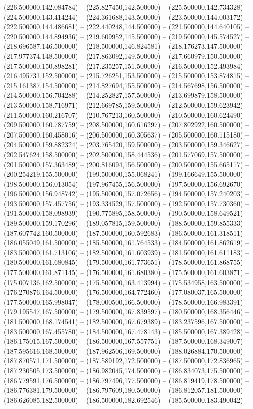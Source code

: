 (226.500000,142.084784) -- (225.827450,142.500000) -- (225.500000,142.734328) -- (224.500000,143.414244) -- (224.361688,143.500000) -- (223.500000,144.003172) -- (222.500000,144.486681) -- (222.440248,144.500000) -- (221.500000,144.640105) -- (220.500000,144.894936) -- (219.609952,145.500000) -- (219.500000,145.574527) -- (218.696587,146.500000) -- (218.500000,146.824581) -- (218.176273,147.500000) -- (217.977374,148.500000) -- (217.863092,149.500000) -- (217.660979,150.500000) -- (217.500000,150.898281) -- (217.235257,151.500000) -- (216.500000,152.493984) -- (216.495731,152.500000) -- (215.726251,153.500000) -- (215.500000,153.874815) -- (215.161387,154.500000) -- (214.827694,155.500000) -- (214.567698,156.500000) -- (214.500000,156.704288) -- (214.252827,157.500000) -- (213.699879,158.500000) -- (213.500000,158.716971) -- (212.669785,159.500000) -- (212.500000,159.623942) -- (211.500000,160.216707) -- (210.767213,160.500000) -- (210.500000,160.624490) -- (209.500000,160.787759) -- (208.500000,160.616297) -- (207.802922,160.500000) -- (207.500000,160.458016) -- (206.500000,160.305637) -- (205.500000,160.115180) -- (204.500000,159.882324) -- (203.765420,159.500000) -- (203.500000,159.346627) -- (202.547624,158.500000) -- (202.500000,158.444536) -- (201.577069,157.500000) -- (201.500000,157.363489) -- (200.816094,156.500000) -- (200.500000,155.665117) -- (200.254219,155.500000) -- (199.500000,155.068241) -- (199.166649,155.500000) -- (198.500000,156.013054) -- (197.967455,156.500000) -- (197.500000,156.692670) -- (196.500000,156.948742) -- (195.500000,157.072656) -- (194.500000,157.240203) -- (193.500000,157.457756) -- (193.334529,157.500000) -- (192.500000,157.730360) -- (191.500000,158.098939) -- (190.775895,158.500000) -- (190.500000,158.649521) -- (189.500000,159.170296) -- (189.057815,159.500000) -- (188.500000,159.855333) -- (187.607742,160.500000) -- (187.500000,160.592683) -- (186.500000,161.318511) -- (186.055049,161.500000) -- (185.500000,161.764533) -- (184.500000,161.862619) -- (183.500000,161.713106) -- (182.500000,161.603939) -- (181.500000,161.611183) -- (180.500000,161.680845) -- (179.500000,161.773651) -- (178.500000,161.868755) -- (177.500000,161.871145) -- (176.500000,161.680380) -- (175.500000,161.603871) -- (175.007136,162.500000) -- (175.500000,163.413994) -- (175.534958,163.500000) -- (176.270876,164.500000) -- (176.500000,164.772460) -- (177.080037,165.500000) -- (177.500000,165.998047) -- (178.000500,166.500000) -- (178.500000,166.983391) -- (179.195547,167.500000) -- (179.500000,167.839597) -- (180.500000,168.356446) -- (181.500000,168.174541) -- (182.500000,167.679389) -- (183.237596,167.500000) -- (183.500000,167.455780) -- (184.500000,167.478143) -- (185.500000,167.389428) -- (186.175015,167.500000) -- (186.500000,167.557751) -- (187.500000,168.349007) -- (187.595616,168.500000) -- (187.962506,169.500000) -- (188.026884,170.500000) -- (187.870571,171.500000) -- (187.589192,172.500000) -- (187.500000,172.836965) -- (187.230505,173.500000) -- (186.982045,174.500000) -- (186.834073,175.500000) -- (186.779591,176.500000) -- (186.797496,177.500000) -- (186.819419,178.500000) -- (186.776381,179.500000) -- (186.797609,180.500000) -- (186.812057,181.500000) -- (186.626085,182.500000) -- (186.500000,182.692546) -- (185.500000,183.490042) -- 